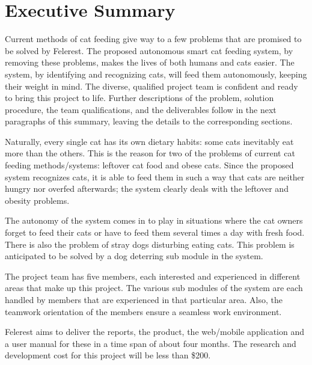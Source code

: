 \section{Executive Summary} \label{sec:exec_sum}

Current methods of cat feeding give way to a few problems that are promised to be solved by Felerest. The proposed autonomous smart cat feeding system, by removing these problems, makes the lives of both humans and cats easier. The system, by identifying and recognizing cats, will feed them autonomously, keeping their weight in mind. The diverse, qualified project team is confident and ready to bring this project to life. Further descriptions of the problem, solution procedure, the team qualifications, and the deliverables follow in the next paragraphs of this summary, leaving the details to the corresponding sections.

Naturally, every single cat has its own dietary habits: some cats inevitably eat more than the others. This is the reason for two of the problems of current cat feeding methods/systems: leftover cat food and obese cats. Since the proposed system recognizes cats, it is able to feed them in such a way that cats are neither hungry nor overfed afterwards; the system clearly deals with the leftover and obesity problems.

The autonomy of the system comes in to play in situations where the cat owners forget to feed their cats or have to feed them several times a day with fresh food. There is also the problem of stray dogs disturbing eating cats. This problem is anticipated to be solved by a dog deterring sub module in the system.

The project team has five members, each interested and experienced in different areas that make up this project. The various sub modules of the system are each handled by members that are experienced in that particular area. Also, the teamwork orientation of the members ensure a seamless work environment.

Felerest aims to deliver the reports, the product, the web/mobile application and a user manual for these in a time span of about four months. The research and development cost for this project will be less than \$200.